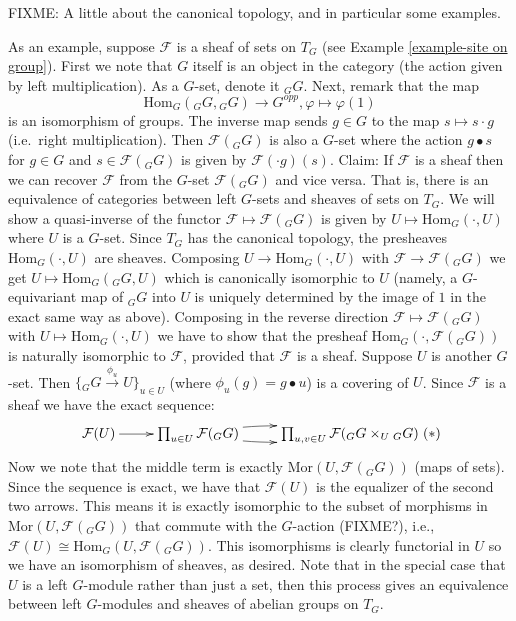 FIXME: A little about the canonical topology, and in particular some examples.

\begin{example}
As an example, suppose $\mathcal{F}$ is a sheaf of sets on $T_G$
(see Example \ref{example-site on group}).  First we note that $G$ 
itself is an object in the category (the action given by left 
multiplication). As a $G$-set, denote it ${}_GG$. Next, remark that
the map
$$
\text{Hom}_G({}_GG,{}_GG) \longrightarrow G^{opp}, 
\varphi \longmapsto \varphi(1)
$$
is an isomorphism of groups. The inverse map sends $g \in G$
to the map $ s \mapsto s \cdot g$ (i.e.\ right multiplication). Then
$\mathcal{F}({}_GG)$ is also a $G$-set where the action $g \bullet s$
for $g \in G$ and $s \in \mathcal{F}({}_GG)$ is given by
$\mathcal{F}(\cdot g)(s)$. Claim: If $\mathcal{F}$ is a sheaf then we
can recover $\mathcal{F}$ from the $G$-set $\mathcal{F}({}_GG)$
and vice versa. That is, there is an equivalence of categories
between left $G$-sets and sheaves of sets on $T_G$. We will show a
quasi-inverse of the functor $\mathcal{F} \mapsto \mathcal{F}({}_GG)$ is
given by $U \mapsto \text{Hom}_G(\cdot, U)$ where $U$ is a $G$-set. 
Since $T_G$ has the canonical topology, the presheaves  
$\text{Hom}_G(\cdot, U)$ are sheaves.
Composing $U \rightarrow \text{Hom}_G(\cdot, U)$ with 
$\mathcal{F} \rightarrow \mathcal{F}({}_GG)$ we get 
$U \mapsto \text{Hom}_G({}_GG,U)$ which is
canonically isomorphic to $U$ (namely, a $G$-equivariant map of ${}_GG$ 
into $U$ is uniquely determined by the image of $1$ in the exact same way 
as above). Composing in the reverse direction $\mathcal{F} \mapsto 
\mathcal{F}({}_GG)$ with $U \mapsto \text{Hom}_G(\cdot, U)$ we have to 
show that the presheaf $\text{Hom}_G(\cdot, \mathcal{F}({}_GG))$ is naturally
isomorphic to $\mathcal{F}$, provided that $\mathcal{F}$ is a sheaf.
Suppose $U$ is another $G$-set. Then
$\{{}_GG \stackrel{\phi_u}{\rightarrow} U\}_{u \in U}$ (where
$\phi_u(g) = g \bullet u$) is a covering of $U$. Since $\mathcal{F}$ is a 
sheaf we have the exact sequence:
$$
\xymatrix{ \mathcal{F}(U) \ar[r] & \prod\nolimits_{u \in U}
\mathcal{F}({}_GG) \ar@/^/[r] \ar@/_/[r] & \prod\nolimits_{u, v \in
U} \mathcal{F}({}_GG \times_U{}_GG) } \leqno{(*)}
$$
Now we note that the middle term is exactly 
$\text{Mor}(U,\mathcal{F}({}_GG))$ (maps of sets). Since the sequence is 
exact, we have that $\mathcal{F}(U)$ is the equalizer of the second two
arrows. This means it is exactly isomorphic to the subset of morphisms in
$\text{Mor}(U, \mathcal{F}(_G G))$ that commute with the $G$-action (FIXME?),
i.e., $\mathcal{F}(U) \cong \text{Hom}_G(U, \mathcal{F}({}_GG))$.
This isomorphisms is clearly functorial in $U$ so we have an
isomorphism of sheaves, as desired. Note that in the special case that 
$U$ is a left $G$-module rather than just a set, then this process gives 
an equivalence between left $G$-modules and sheaves of abelian groups on $T_G$.
\end{example}

